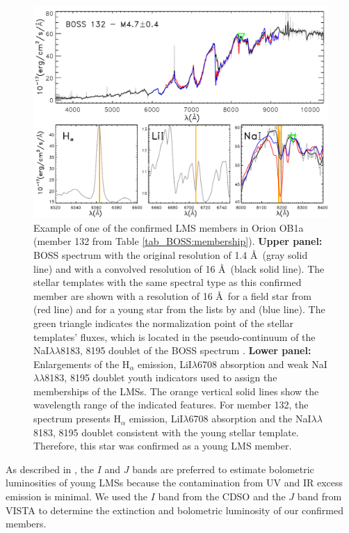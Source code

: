 \documentclass[12pt]{article}
\newcounter{subsubsubsection}[subsubsection]
\begin{document}
\begin{figure}%
	\centering \includegraphics[width=1.\textwidth]{f5.pdf}
	\caption[Membership criteria for M-type stars]{Example of one of the confirmed LMS members in Orion OB1a (member 132 from Table \ref{tab_BOSS:membership}). \textbf {Upper panel:} BOSS spectrum with the original resolution of 1.4 \AA\ (gray solid line) and with a convolved resolution of 16 \AA\ (black solid line). The stellar templates with the same spectral type as this confirmed member are shown with a resolution of 16 \AA\ for a field star from \citet{Kirkpatrick1999} (red line) and for a young star from the lists by \citet{Luhman2000,Briceno2002,Luhman2003b} and \citet{Luhman2004} (blue line). The green triangle indicates the normalization point of the stellar templates' fluxes, which is located in the pseudo-continuum of the NaI$\lambda\lambda$8183, 8195 doublet of the BOSS spectrum \citep{Schlieder2012}. \textbf {Lower panel:} Enlargements of the H$_\alpha$ emission, LiI$\lambda$6708 absorption and weak NaI$\lambda\lambda$8183, 8195 doublet youth indicators used to assign the memberships of the LMSs. The orange vertical solid lines show the wavelength range of the indicated features. For member 132, the spectrum presents H$_\alpha$ emission, LiI$\lambda$6708 absorption and the NaI$\lambda\lambda$8183, 8195 doublet consistent with the young stellar template. Therefore, this star was confirmed as a young LMS member.}
	\label{fig_BOSS:membership}
\end{figure}

\label{sec_BOSS:parameters}

As described in \citet{Luhman1999}, the $I$ and $J$ bands are preferred to estimate bolometric luminosities of young LMSs because the contamination from UV and IR excess emission is minimal. We used the $I$ band from the CDSO and the $J$ band from VISTA to determine the extinction and bolometric luminosity of our confirmed members.
\end{document}
